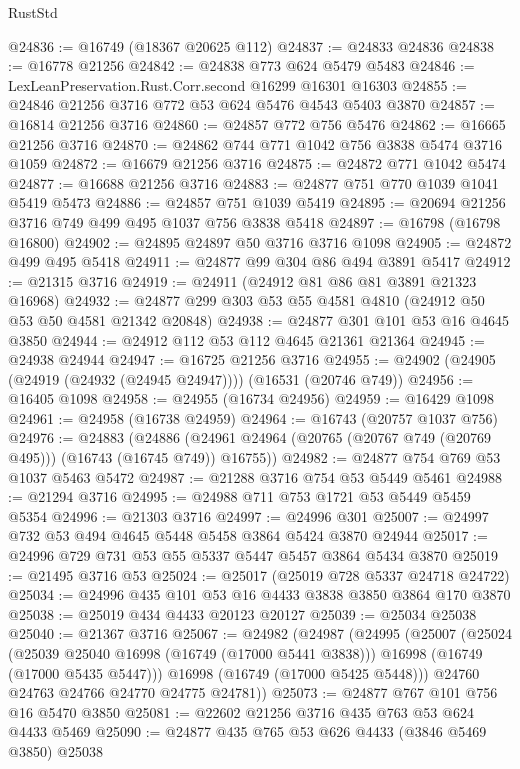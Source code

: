 \begin{lexlean}{RustStd}
\begin{coremodule}
@24836 := @16749 (@18367 @20625 @112)
@24837 := @24833 @24836
@24838 := @16778 @21256
@24842 := @24838 @773 @624 @5479 @5483
@24846 := LexLeanPreservation.Rust.Corr.second @16299 @16301 @16303
@24855 := @24846 @21256 @3716 @772 @53 @624 @5476 @4543 @5403 @3870
@24857 := @16814 @21256 @3716
@24860 := @24857 @772 @756 @5476
@24862 := @16665 @21256 @3716
@24870 := @24862 @744 @771 @1042 @756 @3838 @5474 @3716 @1059
@24872 := @16679 @21256 @3716
@24875 := @24872 @771 @1042 @5474
@24877 := @16688 @21256 @3716
@24883 := @24877 @751 @770 @1039 @1041 @5419 @5473
@24886 := @24857 @751 @1039 @5419
@24895 := @20694 @21256 @3716 @749 @499 @495 @1037 @756 @3838 @5418
@24897 := @16798 (@16798 @16800)
@24902 := @24895 @24897 @50 @3716 @3716 @1098
@24905 := @24872 @499 @495 @5418
@24911 := @24877 @99 @304 @86 @494 @3891 @5417
@24912 := @21315 @3716
@24919 := @24911 (@24912 @81 @86 @81 @3891 @21323 @16968)
@24932 := @24877 @299 @303 @53 @55 @4581 @4810 (@24912 @50 @53 @50 @4581 @21342 @20848)
@24938 := @24877 @301 @101 @53 @16 @4645 @3850
@24944 := @24912 @112 @53 @112 @4645 @21361 @21364
@24945 := @24938 @24944
@24947 := @16725 @21256 @3716
@24955 := @24902 (@24905 (@24919 (@24932 (@24945 @24947)))) (@16531 (@20746 @749))
@24956 := @16405 @1098
@24958 := @24955 (@16734 @24956)
@24959 := @16429 @1098
@24961 := @24958 (@16738 @24959)
@24964 := @16743 (@20757 @1037 @756)
@24976 := @24883
    (@24886 (@24961 @24964 (@20765 (@20767 @749 (@20769 @495))) (@16743 (@16745 @749)) @16755))
@24982 := @24877 @754 @769 @53 @1037 @5463 @5472
@24987 := @21288 @3716 @754 @53 @5449 @5461
@24988 := @21294 @3716
@24995 := @24988 @711 @753 @1721 @53 @5449 @5459 @5354
@24996 := @21303 @3716
@24997 := @24996 @301
@25007 := @24997 @732 @53 @494 @4645 @5448 @5458 @3864 @5424 @3870 @24944
@25017 := @24996 @729 @731 @53 @55 @5337 @5447 @5457 @3864 @5434 @3870
@25019 := @21495 @3716 @53
@25024 := @25017 (@25019 @728 @5337 @24718 @24722)
@25034 := @24996 @435 @101 @53 @16 @4433 @3838 @3850 @3864 @170 @3870
@25038 := @25019 @434 @4433 @20123 @20127
@25039 := @25034 @25038
@25040 := @21367 @3716
@25067 := @24982
    (@24987
      (@24995
        (@25007
          (@25024
            (@25039 @25040 @16998 (@16749 (@17000 @5441 @3838)))
            @16998
            (@16749 (@17000 @5435 @5447)))
          @16998
          (@16749 (@17000 @5425 @5448)))
        @24760
        @24763
        @24766
        @24770
        @24775
        @24781))
@25073 := @24877 @767 @101 @756 @16 @5470 @3850
@25081 := @22602 @21256 @3716 @435 @763 @53 @624 @4433 @5469
@25090 := @24877 @435 @765 @53 @626 @4433 (@3846 @5469 @3850) @25038

\end{coremodule}
\end{lexlean}
